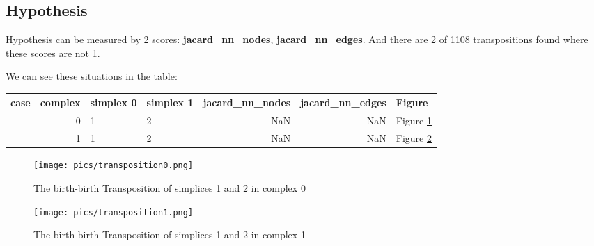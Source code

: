 \documentclass{article}
\begin{document}
\subsection{Hypothesis}
\par Hypothesis can be measured by 2 scores: \textbf{jacard\_nn\_nodes}, \textbf{jacard\_nn\_edges}.
And there are 2 of 1108  transpositions found where these scores are not 1.
\par We can see these situations in the table:
\begin{center}\begin{tabular}{lrllrrl}
\toprule
case & complex & simplex 0 & simplex 1 & jacard\_nn\_nodes & jacard\_nn\_edges & Figure \\
\midrule
& 0 & 1 & 2 & NaN & NaN & Figure \ref{fig:unexpected0} \\
& 1 & 1 & 2 & NaN & NaN & Figure \ref{fig:unexpected1} \\
\bottomrule
\end{tabular}
\end{center}

\begin{figure}[ht]
\centering
\texttt{[image: pics/transposition0.png]}
\caption{The birth-birth Transposition of simplices 1 and 2 in complex 0}
\label{fig:unexpected0}
\end{figure}

\begin{figure}[ht]
\centering
\texttt{[image: pics/transposition1.png]}
\caption{The birth-birth Transposition of simplices 1 and 2 in complex 1}
\label{fig:unexpected1}
\end{figure}
\end{document}
